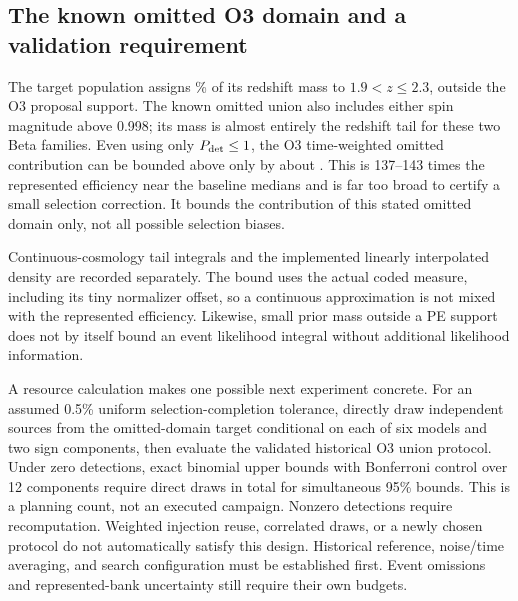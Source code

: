 \begin{table}[tbp]\centering
\caption{One-event completion stress, in pp. The second column spans six model median shifts; the third spans three same-$\lambda$ amplitude gaps. These ranges summarize declared scenarios, not statistical uncertainty.}\label{tab:completion}

\end{table}

\subsection{The known omitted O3 domain and a validation requirement}
The target population assigns \DataTailMass\% of its redshift mass to $1.9<z\leq2.3$, outside the O3 proposal support. The known omitted union also includes either spin magnitude above 0.998; its mass is almost entirely the redshift tail for these two Beta families. Even using only $P_{\rm det}\leq1$, the O3 time-weighted omitted contribution can be bounded above only by about \DataTailBound. This is 137--143 times the represented efficiency near the baseline medians and is far too broad to certify a small selection correction. It bounds the contribution of this stated omitted domain only, not all possible selection biases.

Continuous-cosmology tail integrals and the implemented linearly interpolated density are recorded separately. The bound uses the actual coded measure, including its tiny normalizer offset, so a continuous approximation is not mixed with the represented efficiency. Likewise, small prior mass outside a PE support does not by itself bound an event likelihood integral without additional likelihood information.

A resource calculation makes one possible next experiment concrete. For an assumed 0.5\% uniform selection-completion tolerance, directly draw independent sources from the omitted-domain target conditional on each of six models and two sign components, then evaluate the validated historical O3 union protocol. Under zero detections, exact binomial upper bounds with Bonferroni control over 12 components require \DataTailPlan{} direct draws in total for simultaneous 95\% bounds. This is a planning count, not an executed campaign. Nonzero detections require recomputation. Weighted injection reuse, correlated draws, or a newly chosen protocol do not automatically satisfy this design. Historical reference, noise/time averaging, and search configuration must be established first. Event omissions and represented-bank uncertainty still require their own budgets.

